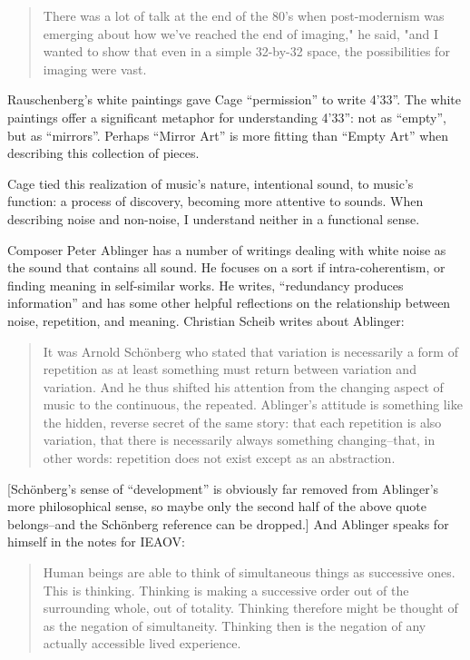 \documentclass{thesis}
\begin{document}
	\begin{quote}
	There was a lot of talk at the end of the 80's when post-modernism was emerging about how we've reached the end of imaging," he said, "and I wanted to show that even in a simple 32-by-32 space, the possibilities for imaging were vast.\cite{matthew_mirapaul_in_1997}
	\end{quote}
	
	Rauschenberg's white paintings gave Cage ``permission'' to write 4'33''. The white paintings offer a significant metaphor for understanding 4'33'': not as ``empty'', but as ``mirrors''. Perhaps ``Mirror Art'' is more fitting than ``Empty Art'' when describing this collection of pieces.
	
	Cage tied this realization of music's nature, intentional sound, to music's function: a process of discovery, becoming more attentive to sounds. When describing noise and non-noise, I understand neither in a functional sense.
		
	Composer Peter Ablinger has a number of writings dealing with white noise as the sound that contains all sound. He focuses on a sort if intra-coherentism, or finding meaning in self-similar works. He writes, ``redundancy produces information''\cite{christian_scheib_statics_????} and has some other helpful reflections on the relationship between noise, repetition, and meaning. Christian Scheib writes about Ablinger:
	
	\begin{quote}
	It was Arnold Sch\"onberg who stated that variation is necessarily a form of repetition as at least something must return between variation and variation. And he thus shifted his attention from the changing aspect of music to the continuous, the repeated. Ablinger's attitude is something like the hidden, reverse secret of the same story: that each repetition is also variation, that there is necessarily always something changing--that, in other words: repetition does not exist except as an abstraction. 
	\end{quote}
	
	[Sch\"onberg's sense of ``development'' is obviously far removed from Ablinger's more philosophical sense, so maybe only the second half of the above quote belongs--and the Sch\"onberg reference can be dropped.]	And Ablinger speaks for himself in the notes for IEAOV:
	
	\begin{quote}
	Human beings are able to think of simultaneous things as successive ones. This is thinking. Thinking is making a successive order out of the surrounding whole, out of totality. Thinking therefore might be thought of as the negation of simultaneity. Thinking then is the negation of any actually accessible lived experience.
	\end{quote}
	
\end{document}
